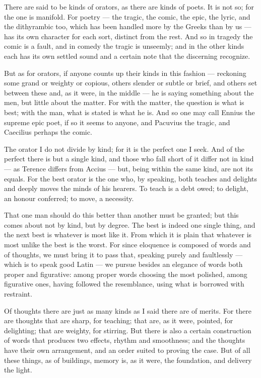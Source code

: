 
 There are said to be kinds of orators, as there are kinds of poets. It is not so; for the one is manifold. For poetry --- the tragic, the comic, the epic, the lyric, and the dithyrambic too, which has been handled more by the Greeks than by us --- has its own character for each sort, distinct from the rest. And so in tragedy the comic is a fault, and in comedy the tragic is unseemly; and in the other kinds each has its own settled sound and a certain note that the discerning recognize.

 But as for orators, if anyone counts up their kinds in this fashion --- reckoning some grand or weighty or copious, others slender or subtle or brief, and others set between these and, as it were, in the middle --- he is saying something about the men, but little about the matter. For with the matter, the question is what is best; with the man, what is stated is what he is. And so one may call Ennius the supreme epic poet, if so it seems to anyone, and Pacuvius the tragic, and Caecilius perhaps the comic.

 The orator I do not divide by kind; for it is the perfect one I seek. And of the perfect there is but a single kind, and those who fall short of it differ not in kind --- as Terence differs from Accius --- but, being within the same kind, are not its equals. For the best orator is the one who, by speaking, both teaches and delights and deeply moves the minds of his hearers. To teach is a debt owed; to delight, an honour conferred; to move, a necessity.

 That one man should do this better than another must be granted; but this comes about not by kind, but by degree. The best is indeed one single thing, and the next best is whatever is most like it. From which it is plain that whatever is most unlike the best is the worst. For since eloquence is composed of words and of thoughts, we must bring it to pass that, speaking purely and faultlessly --- which is to speak good Latin --- we pursue besides an elegance of words both proper and figurative: among proper words choosing the most polished, among figurative ones, having followed the resemblance, using what is borrowed with restraint.

 Of thoughts there are just as many kinds as I said there are of merits. For there are thoughts that are sharp, for teaching; that are, as it were, pointed, for delighting; that are weighty, for stirring. But there is also a certain construction of words that produces two effects, rhythm and smoothness; and the thoughts have their own arrangement, and an order suited to proving the case. But of all these things, as of buildings, memory is, as it were, the foundation, and delivery the light.

